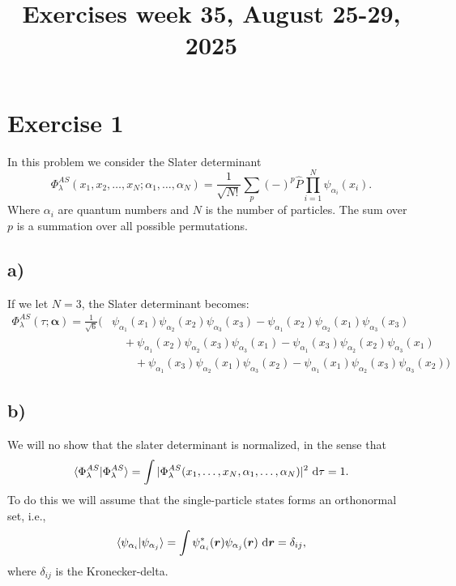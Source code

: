\documentclass[a4paper, 11pt, notitlepage, english]{article}
\title{Exercises week 35, August 25-29, 2025}
\newcommand{\braket}[2]{\langle #1 | #2 \rangle}
\newcommand{\op}[1]{\hat{#1}}
\renewcommand{\d}{{\rm d}}
\newcommand{\bt}[1]{\boldsymbol{#1}}
\begin{document}
\maketitle

\section*{Exercise 1}

In this problem we consider the Slater determinant
$$\Phi_\lambda^{AS} (x_1, x_2, \ldots, x_N; \alpha_1, \ldots, \alpha_N) = \frac{1}{\sqrt{N!}}\sum_p (-)^p \op{P} \prod_{i=1}^N \psi_{\alpha_i}(x_i).$$
Where $\alpha_i$ are quantum numbers and $N$ is the number of particles. The sum over $p$ is a summation over all possible permutations.

\subsection*{a)}
If we let $N=3$, the Slater determinant becomes:
\begin{align*}   
\Phi_\lambda^{AS}(\tau;\bt{\alpha}) = \frac{1}{\sqrt{6}} \bigg(
&\psi_{\alpha_1}(x_1) \psi_{\alpha_2} (x_2)\psi_{\alpha_3}(x_3)
- \psi_{\alpha_1}(x_2) \psi_{\alpha_2} (x_1)\psi_{\alpha_3}(x_3) \\
&\quad+ \psi_{\alpha_1}(x_2) \psi_{\alpha_2} (x_3)\psi_{\alpha_3}(x_1)  
- \psi_{\alpha_1}(x_3) \psi_{\alpha_2} (x_2)\psi_{\alpha_3}(x_1) \\
&\qquad+ \psi_{\alpha_1}(x_3) \psi_{\alpha_2} (x_1)\psi_{\alpha_3}(x_2) 
- \psi_{\alpha_1}(x_1) \psi_{\alpha_2} (x_3)\psi_{\alpha_3}(x_2)\bigg)
\end{align*}

\subsection*{b)}
We will no show that the slater determinant is normalized, in the sense that
$$\braket{\Phi_\lambda^{AS}}{\Phi_\lambda^{AS}} = \int |\Phi_\lambda^{AS} (x_1,\ldots, x_N, \alpha_1, \ldots, \alpha_N)|^2 \ \d \tau= 1.$$
To do this we will assume that the single-particle states forms an orthonormal set, i.e.,
$$\braket{\psi_{\alpha_i}}{\psi_{\alpha_j}} = \int \psi^*_{\alpha_i}(\bt{r})\psi_{\alpha_j}(\bt{r}) \ \d \bt{r} = \delta_{ij},$$
where $\delta_{ij}$ is the Kronecker-delta.
\end{document}
